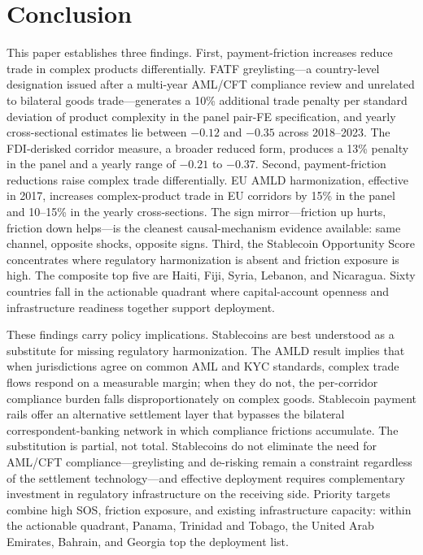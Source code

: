 \section{Conclusion}
\label{sec:conclusion}

This paper establishes three findings. First, payment-friction increases reduce trade in complex products differentially. FATF greylisting---a country-level designation issued after a multi-year AML/CFT compliance review and unrelated to bilateral goods trade---generates a 10\% additional trade penalty per standard deviation of product complexity in the panel pair-FE specification, and yearly cross-sectional estimates lie between $-0.12$ and $-0.35$ across 2018--2023. The FDI-derisked corridor measure, a broader reduced form, produces a 13\% penalty in the panel and a yearly range of $-0.21$ to $-0.37$. Second, payment-friction reductions raise complex trade differentially. EU AMLD harmonization, effective in 2017, increases complex-product trade in EU corridors by 15\% in the panel and 10--15\% in the yearly cross-sections. The sign mirror---friction up hurts, friction down helps---is the cleanest causal-mechanism evidence available: same channel, opposite shocks, opposite signs. Third, the Stablecoin Opportunity Score concentrates where regulatory harmonization is absent and friction exposure is high. The composite top five are Haiti, Fiji, Syria, Lebanon, and Nicaragua. Sixty countries fall in the actionable quadrant where capital-account openness and infrastructure readiness together support deployment.

These findings carry policy implications. Stablecoins are best understood as a substitute for missing regulatory harmonization. The AMLD result implies that when jurisdictions agree on common AML and KYC standards, complex trade flows respond on a measurable margin; when they do not, the per-corridor compliance burden falls disproportionately on complex goods. Stablecoin payment rails offer an alternative settlement layer that bypasses the bilateral correspondent-banking network in which compliance frictions accumulate. The substitution is partial, not total. Stablecoins do not eliminate the need for AML/CFT compliance---greylisting and de-risking remain a constraint regardless of the settlement technology---and effective deployment requires complementary investment in regulatory infrastructure on the receiving side. Priority targets combine high SOS, friction exposure, and existing infrastructure capacity: within the actionable quadrant, Panama, Trinidad and Tobago, the United Arab Emirates, Bahrain, and Georgia top the deployment list.

